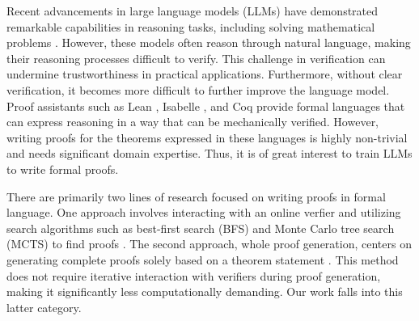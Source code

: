 Recent advancements in large language models (LLMs) have demonstrated remarkable capabilities in reasoning tasks, including solving mathematical problems \citep{wei2022chain, liu2024deepseek, yang2024qwen2}. However, these models often reason through natural language, making their reasoning processes difficult to verify. This challenge in verification can undermine trustworthiness in practical applications. Furthermore, without clear verification, it becomes more difficult to further improve the language model. Proof assistants such as Lean \citep{de2015lean, moura2021lean},  Isabelle \citep{paulson1994isabelle}, and Coq \citep{barras1997coq} provide formal languages that can express reasoning in a way that can be mechanically verified. However, writing proofs for the theorems expressed in these languages is highly non-trivial and needs significant domain expertise. Thus, it is of great interest to train LLMs to write formal proofs.  

There are primarily two lines of research focused on writing proofs in formal language. One approach involves interacting with an online verfier and utilizing search algorithms such as best-first search (BFS) and Monte Carlo tree search (MCTS) to find proofs \citep{jiang2021lisa, han2021proof, wang2020learning, li2024hunyuanprover, wu2024internlm2}. The second approach, whole proof generation,  centers on generating complete proofs solely based on a theorem statement \citep{jiang2022draft, wang2024theoremllama, xin2024deepseek, xin2024deepseekv15}. This method does not require iterative interaction with verifiers during proof generation, making it significantly less computationally demanding. Our work falls into this latter category.

